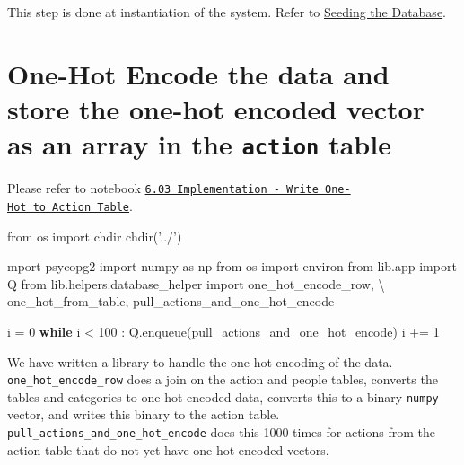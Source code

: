 \documentclass[]{report}
\newenvironment{Shaded}{}{}
\newcommand{\DecValTok}[1]{\textcolor[rgb]{0.25,0.63,0.44}{{#1}}}
\newcommand{\StringTok}[1]{\textcolor[rgb]{0.25,0.44,0.63}{{#1}}}
\newcommand{\ImportTok}[1]{{#1}}
\newcommand{\ControlFlowTok}[1]{\textcolor[rgb]{0.00,0.44,0.13}{\textbf{{#1}}}}
\newcommand{\OperatorTok}[1]{\textcolor[rgb]{0.40,0.40,0.40}{{#1}}}
\newcommand{\NormalTok}[1]{{#1}}
\begin{document}
This step is done at instantiation of the system. Refer to
\protect\hyperlink{seeding-the-database}{Seeding the Database}.

\chapter{\texorpdfstring{One-Hot Encode the data and store the one-hot
encoded vector as an array in the \texttt{action}
table}{One-Hot Encode the data and store the one-hot encoded vector as an array in the action table}}\label{one-hot-encode-the-data-and-store-the-one-hot-encoded-vector-as-an-array-in-the-action-table}

Please refer to notebook
\href{http://joshuacook.me:8003/notebooks/ipynb/6.03\%20Implementation\%20-\%20Write\%20One-Hot\%20to\%20Action\%20Table.ipynb}{\texttt{6.03\ Implementation\ -\ Write\ One-Hot\ to\ Action\ Table}}.

\begin{Shaded}
\begin{Highlighting}[]
\ImportTok{from} \NormalTok{os }\ImportTok{import} \NormalTok{chdir}
\NormalTok{chdir(}\StringTok{'../'}\NormalTok{)}
\end{Highlighting}
\end{Shaded}

\begin{Shaded}
\begin{Highlighting}[]
\NormalTok{mport psycopg2}
\ImportTok{import} \NormalTok{numpy }\ImportTok{as} \NormalTok{np}
\ImportTok{from} \NormalTok{os }\ImportTok{import} \NormalTok{environ}
\ImportTok{from} \NormalTok{lib.app }\ImportTok{import} \NormalTok{Q}
\ImportTok{from} \NormalTok{lib.helpers.database_helper }\ImportTok{import} \NormalTok{one_hot_encode_row, }\OperatorTok{\textbackslash{}}
    \NormalTok{one_hot_from_table, pull_actions_and_one_hot_encode}
\end{Highlighting}
\end{Shaded}

\begin{Shaded}
\begin{Highlighting}[]
 \NormalTok{i }\OperatorTok{=} \DecValTok{0}
 \ControlFlowTok{while} \NormalTok{i }\OperatorTok{<} \DecValTok{100} \NormalTok{:}
    \NormalTok{Q.enqueue(pull_actions_and_one_hot_encode)}
    \NormalTok{i }\OperatorTok{+=} \DecValTok{1}
\end{Highlighting}
\end{Shaded}

We have written a library to handle the one-hot encoding of the data.
\texttt{one\_hot\_encode\_row} does a join on the action and people
tables, converts the tables and categories to one-hot encoded data,
converts this to a binary \texttt{numpy} vector, and writes this binary
to the action table. \texttt{pull\_actions\_and\_one\_hot\_encode} does
this 1000 times for actions from the action table that do not yet have
one-hot encoded vectors.
\end{document}
